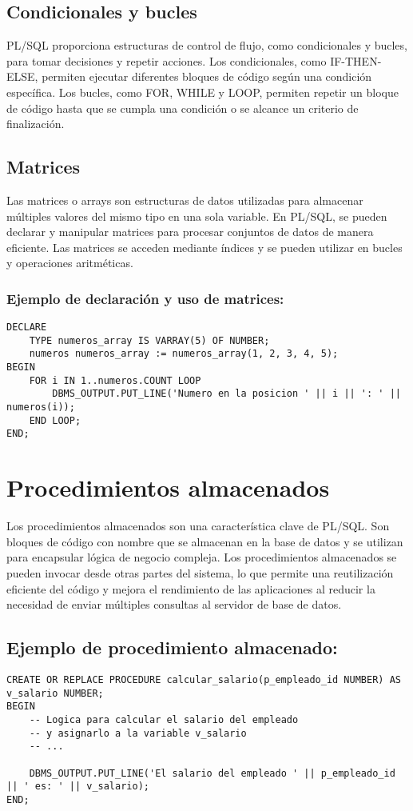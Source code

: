 \documentclass[executivepaper]{article}
\begin{document}
\subsection{Condicionales y bucles}
PL/SQL proporciona estructuras de control de flujo, como condicionales y bucles, para tomar decisiones y repetir acciones. Los condicionales, como IF-THEN-ELSE, permiten ejecutar diferentes bloques de código según una condición específica. Los bucles, como FOR, WHILE y LOOP, permiten repetir un bloque de código hasta que se cumpla una condición o se alcance un criterio de finalización.



\subsection{Matrices}
Las matrices o arrays son estructuras de datos utilizadas para almacenar múltiples valores del mismo tipo en una sola variable. En PL/SQL, se pueden declarar y manipular matrices para procesar conjuntos de datos de manera eficiente. Las matrices se acceden mediante índices y se pueden utilizar en bucles y operaciones aritméticas.

\subsubsection{Ejemplo de declaración y uso de matrices:}
\begin{lstlisting}
DECLARE
    TYPE numeros_array IS VARRAY(5) OF NUMBER;
    numeros numeros_array := numeros_array(1, 2, 3, 4, 5);
BEGIN
    FOR i IN 1..numeros.COUNT LOOP
        DBMS_OUTPUT.PUT_LINE('Numero en la posicion ' || i || ': ' || numeros(i));
    END LOOP;
END;
\end{lstlisting}

\section{Procedimientos almacenados}
Los procedimientos almacenados son una característica clave de PL/SQL. Son bloques de código con nombre que se almacenan en la base de datos y se utilizan para encapsular lógica de negocio compleja. Los procedimientos almacenados se pueden invocar desde otras partes del sistema, lo que permite una reutilización eficiente del código y mejora el rendimiento de las aplicaciones al reducir la necesidad de enviar múltiples consultas al servidor de base de datos.

\subsection{Ejemplo de procedimiento almacenado:}
\begin{lstlisting}
CREATE OR REPLACE PROCEDURE calcular_salario(p_empleado_id NUMBER) AS
v_salario NUMBER;
BEGIN
    -- Logica para calcular el salario del empleado
    -- y asignarlo a la variable v_salario
    -- ...

    DBMS_OUTPUT.PUT_LINE('El salario del empleado ' || p_empleado_id || ' es: ' || v_salario);
END;
\end{lstlisting}
\end{document}
